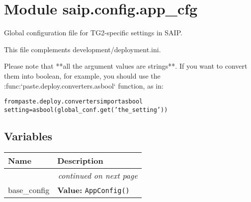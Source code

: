 %
%
%


\section{Module saip.config.app\_cfg}

    \label{saip:config:app_cfg}
Global configuration file for TG2-specific settings in SAIP.

This file complements development/deployment.ini.

Please note that **all the argument values are strings**. If you want to 
convert them into boolean, for example, you should use the 
:func:`paste.deploy.converters.asbool` function, as in:

\begin{alltt}
   from paste.deploy.converters import asbool
   setting = asbool(global\_conf.get('the\_setting'))\end{alltt}



  \subsection{Variables}

    \vspace{-1cm}
\hspace{\varindent}\begin{longtable}{|p{\varnamewidth}|p{\vardescrwidth}|l}
\cline{1-2}
\cline{1-2} \centering \textbf{Name} & \centering \textbf{Description}& \\
\cline{1-2}
\endhead\cline{1-2}\multicolumn{3}{r}{\small\textit{continued on next page}}\\\endfoot\cline{1-2}
\endlastfoot\raggedright b\-a\-s\-e\-\_\-c\-o\-n\-f\-i\-g\- & \raggedright \textbf{Value:} 
{\tt AppConfig()}&\\
\cline{1-2}
\end{longtable}

